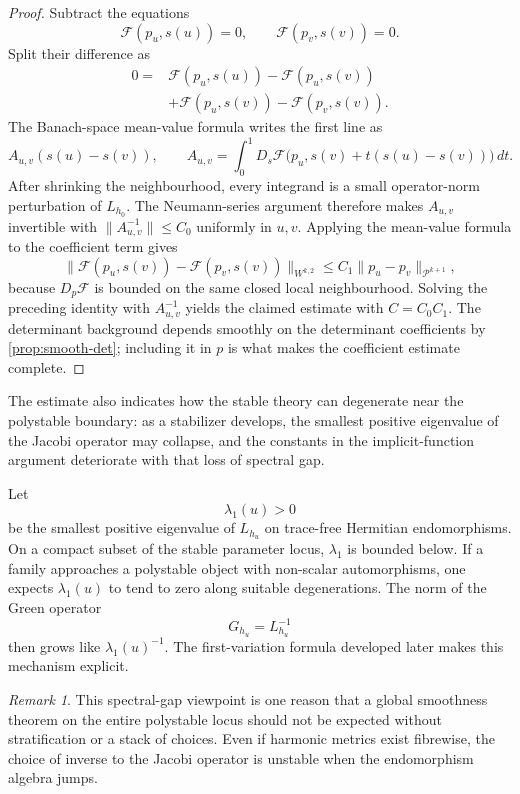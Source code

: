 \documentclass[11pt,reqno]{amsart}
\theoremstyle{definition}
\theoremstyle{remark}
\newtheorem{remark}[theorem]{Remark}
\newcommand{\cF}{\mathcal F}
\begin{document}
\begin{proof}
Subtract the equations
\[
  \cF(p_u,s(u))=0,
  \qquad
  \cF(p_v,s(v))=0.
\]
Split their difference as
\begin{align*}
0={}&\cF(p_u,s(u))-\cF(p_u,s(v))\\
   &+\cF(p_u,s(v))-\cF(p_v,s(v)).
\end{align*}
The Banach-space mean-value formula writes the first line as
\[
 A_{u,v}(s(u)-s(v)),
 \qquad
 A_{u,v}=\int_0^1D_s\cF
   \bigl(p_u,s(v)+t(s(u)-s(v))\bigr)\,dt.
\]
After shrinking the neighbourhood, every integrand is a small
operator-norm perturbation of $L_{h_0}$.  The Neumann-series argument
therefore makes $A_{u,v}$ invertible with
$\|A_{u,v}^{-1}\|\le C_0$ uniformly in $u,v$.  Applying the mean-value
formula to the coefficient term gives
\[
 \|\cF(p_u,s(v))-\cF(p_v,s(v))\|_{W^{k,2}}
 \le C_1\|p_u-p_v\|_{\mathcal P^{k+1}},
\]
because $D_p\cF$ is bounded on the same closed local neighbourhood.
Solving the preceding identity with $A_{u,v}^{-1}$ yields the claimed
estimate with $C=C_0C_1$.  The determinant background depends smoothly
on the determinant coefficients by \cref{prop:smooth-det}; including it
in $p$ is what makes the coefficient estimate complete.
\end{proof}

The estimate also indicates how the stable theory can degenerate near
the polystable boundary: as a stabilizer develops, the smallest positive
eigenvalue of the Jacobi operator may collapse, and the constants in the
implicit-function argument deteriorate with that loss of spectral gap.


Let
\[
  \lambda_1(u)>0
\]
be the smallest positive eigenvalue of $L_{h_u}$ on trace-free Hermitian endomorphisms.  On a compact subset of the stable parameter locus, $\lambda_1$ is bounded below.  If a family approaches a polystable object with non-scalar automorphisms, one expects $\lambda_1(u)$ to tend to zero along suitable degenerations.  The norm of the Green operator
\[
  G_{h_u}=L_{h_u}^{-1}
\]
then grows like $\lambda_1(u)^{-1}$.  The first-variation formula developed later makes this mechanism explicit.

\begin{remark}
This spectral-gap viewpoint is one reason that a global smoothness theorem on the entire polystable locus should not be expected without stratification or a stack of choices.  Even if harmonic metrics exist fibrewise, the choice of inverse to the Jacobi operator is unstable when the endomorphism algebra jumps.
\end{remark}
\end{document}
